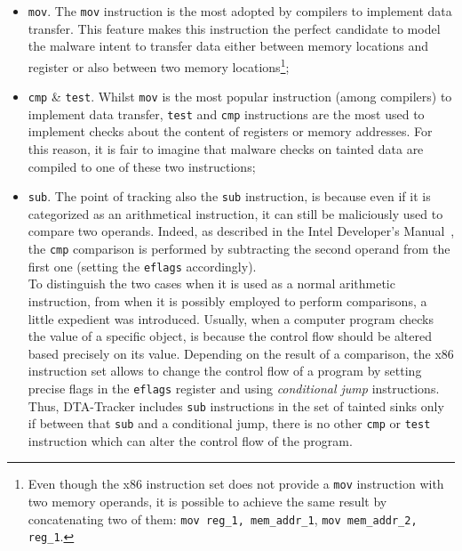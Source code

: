 \documentclass[LaM,binding=0.6cm]{sapthesis}
\begin{document}
\begin{itemize}
\item \texttt{mov}. The \texttt{mov} instruction is the most adopted by compilers to implement data transfer. This feature makes this instruction the perfect candidate to model the malware intent to transfer data either between memory locations and register or also between two memory locations\footnote{Even though the x$86$ instruction set does not provide a \texttt{mov} instruction with two memory operands, it is possible to achieve the same result by concatenating two of them: \texttt{mov reg\_1, mem\_addr\_1}, \texttt{mov mem\_addr\_2, reg\_1}.};
\item \texttt{cmp} \& \texttt{test}. Whilst \texttt{mov} is the most popular instruction (among compilers) to implement data transfer, \texttt{test} and \texttt{cmp} instructions are the most used to implement checks about the content of registers or memory addresses. For this reason, it is fair to imagine that malware checks on tainted data are compiled to one of these two instructions;
\item \texttt{sub}. The point of tracking also the \texttt{sub} instruction, is because even if it is categorized as an arithmetical instruction, it can still be maliciously used to compare two operands. Indeed, as described in the Intel Developer's Manual~\cite{intel2018intel}, the \texttt{cmp} comparison is performed by subtracting the second operand from the first one (setting the \texttt{eflags} accordingly).\\
To distinguish the two cases when it is used as a normal arithmetic instruction, from when it is possibly employed to perform comparisons, a little expedient was introduced. Usually, when a computer program checks the value of a specific object, is because the control flow should be altered based precisely on its value. Depending on the result of a comparison, the x$86$ instruction set allows to change the control flow of a program by setting precise flags in the \texttt{eflags} register and using \textit{conditional jump} instructions. Thus, DTA-Tracker includes \texttt{sub} instructions in the set of tainted sinks only if between that \texttt{sub} and a conditional jump, there is no other \texttt{cmp} or \texttt{test} instruction which can alter the control flow of the program.
\end{itemize}
\end{document}
